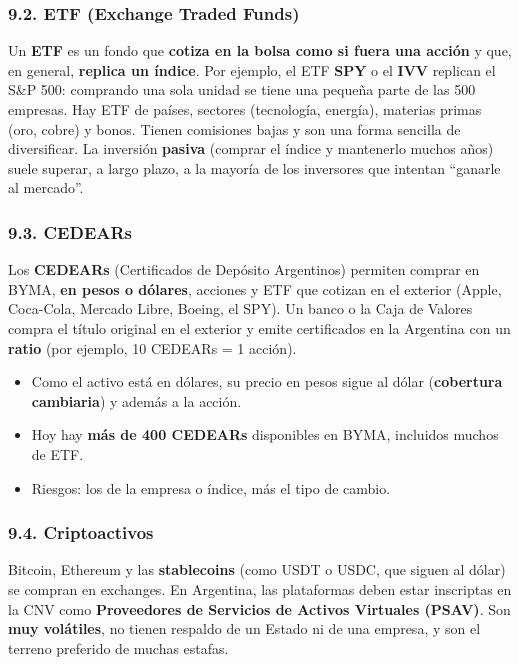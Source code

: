 \subsubsection*{9.2. ETF (Exchange Traded Funds)}
Un \textbf{ETF} es un fondo que \textbf{cotiza en la bolsa como si fuera una acción} y que, en
general, \textbf{replica un índice}. Por ejemplo, el ETF \textbf{SPY} o el \textbf{IVV}
replican el S\&P 500: comprando una sola unidad se tiene una pequeña parte de las 500
empresas. Hay ETF de países, sectores (tecnología, energía), materias primas (oro, cobre) y
bonos. Tienen comisiones bajas y son una forma sencilla de diversificar. La inversión
\textbf{pasiva} (comprar el índice y mantenerlo muchos años) suele superar, a largo plazo, a la
mayoría de los inversores que intentan ``ganarle al mercado''.

\subsubsection*{9.3. CEDEARs}
Los \textbf{CEDEARs} (Certificados de Depósito Argentinos) permiten comprar en BYMA, \textbf{en
pesos o dólares}, acciones y ETF que cotizan en el exterior (Apple, Coca-Cola, Mercado Libre,
Boeing, el SPY). Un banco o la Caja de Valores compra el título original en el exterior y
emite certificados en la Argentina con un \textbf{ratio} (por ejemplo, 10 CEDEARs = 1 acción).
\begin{itemize}
  \item Como el activo está en dólares, su precio en pesos sigue al dólar
        (\textbf{cobertura cambiaria}) y además a la acción.
  \item Hoy hay \textbf{más de 400 CEDEARs} disponibles en BYMA, incluidos muchos de ETF.
  \item Riesgos: los de la empresa o índice, más el tipo de cambio.
\end{itemize}

\subsubsection*{9.4. Criptoactivos}
Bitcoin, Ethereum y las \textbf{stablecoins} (como USDT o USDC, que siguen al dólar) se compran
en exchanges. En Argentina, las plataformas deben estar inscriptas en la CNV como
\textbf{Proveedores de Servicios de Activos Virtuales (PSAV)}. Son \textbf{muy volátiles}, no
tienen respaldo de un Estado ni de una empresa, y son el terreno preferido de muchas estafas.

